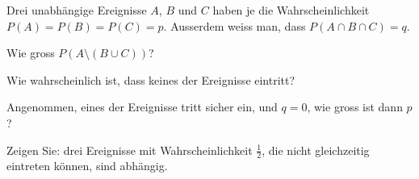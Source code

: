 Drei unabhängige Ereignisse $A$, $B$ und $C$ haben je die Wahrscheinlichkeit
$P(A)=P(B)=P(C)=p$. Ausserdem weiss man, dass $P(A\cap B\cap C)=q$.
\begin{teilaufgaben}
\item Wie gross $P(A\setminus(B\cup C))$?
\item Wie wahrscheinlich ist, dass keines der Ereignisse eintritt?
\item Angenommen, eines der Ereignisse tritt sicher ein, und $q=0$,
wie gross ist dann $p$?
\item Zeigen Sie: drei Ereignisse mit Wahrscheinlichkeit $\frac12$,
die nicht gleichzeitig eintreten können, sind abhängig.
\end{teilaufgaben}


